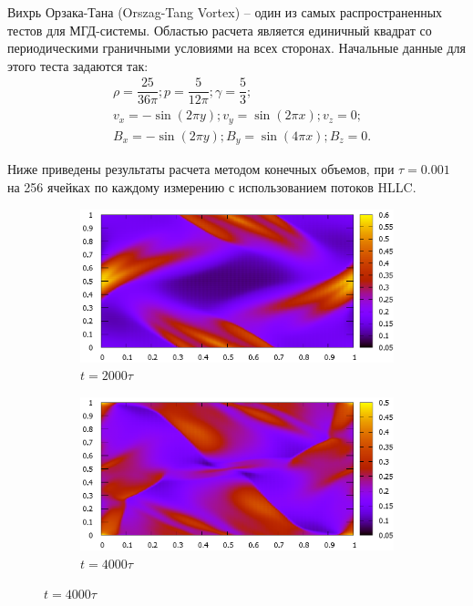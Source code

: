 \documentclass[14pt, a4paper, fleqn]{extreport}
\begin{document}
	Вихрь Орзака-Тана (Orszag-Tang Vortex) --
	один из самых распространенных тестов для МГД-системы.
	Областью расчета является единичный квадрат со периодическими 
	граничными условиями на всех сторонах.
	Начальные данные для этого теста задаются так:
	\begin{equation*}
	\begin{split}
		&\rho = \dfrac{25}{36\pi}; p = \dfrac{5}{12\pi}; \gamma = \dfrac{5}{3}; \\
		&v_x = -\sin(2\pi y); v_y = \sin(2\pi x); v_z = 0; \\
		&B_x = -\sin(2\pi y); B_y = \sin(4\pi x); B_z = 0.
	\end{split}
	\end{equation*}
	
	Ниже приведены результаты расчета методом конечных объемов,
	при $\tau = 0.001$ на 256 ячейках по каждому измерению с 
	использованием потоков HLLC.
	
	\begin{figure}[H]
		\centering
		\caption{$\rho$.}
		\begin{subfigure}{0.9\textwidth}
			\centering
			\caption{$t = 2000\tau$}
			\includegraphics[width=\textwidth]{2D_HLLC_OT_2000.eps}
		\end{subfigure}
		\begin{subfigure}{0.9\textwidth}
			\centering
			\caption{$t = 4000\tau$}
			\includegraphics[width=\textwidth]{2D_HLLC_OT_4000.eps}
		\end{subfigure}
	\end{figure}
\end{document}

